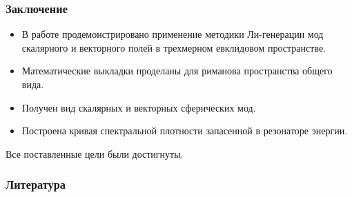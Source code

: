 \documentclass{beamer}
\begin{document}
    \begin{frame}\frametitle{Заключение}

        \begin{itemize}
            \item В работе продемонстрировано применение методики Ли-генерации мод скалярного и векторного полей в трехмерном евклидовом пространстве.

            \item Математические выкладки проделаны для риманова пространства общего вида.

            \item Получен вид скалярных и векторных сферических мод.

            \item Построена кривая спектральной плотности запасенной в резонаторе энергии.
        \end{itemize}

        Все поставленные цели были достигнуты.

    \end{frame}


    \begin{frame}\frametitle{Литература}
        
        
    \end{frame}
\end{document}
